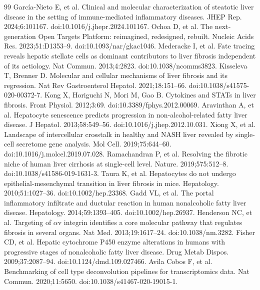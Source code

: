 \documentclass[11pt,a4paper]{article}
\begin{document}
{\begin{thebibliography}{99}
 Garc\'ia-Nieto E, et al. Clinical and molecular characterization of steatotic liver disease in the setting of immune-mediated inflammatory diseases. JHEP Rep. 2024;6:101167. doi:10.1016/j.jhepr.2024.101167.
 Ochoa D, et al. The next-generation Open Targets Platform: reimagined, redesigned, rebuilt. Nucleic Acids Res. 2023;51:D1353--9. doi:10.1093/nar/gkac1046.
 Mederacke I, et al. Fate tracing reveals hepatic stellate cells as dominant contributors to liver fibrosis independent of its aetiology. Nat Commun. 2013;4:2823. doi:10.1038/ncomms3823.
 Kisseleva T, Brenner D. Molecular and cellular mechanisms of liver fibrosis and its regression. Nat Rev Gastroenterol Hepatol. 2021;18:151--66. doi:10.1038/s41575-020-00372-7.
 Kong X, Horiguchi N, Mori M, Gao B. Cytokines and STATs in liver fibrosis. Front Physiol. 2012;3:69. doi:10.3389/fphys.2012.00069.
 Aravinthan A, et al. Hepatocyte senescence predicts progression in non-alcohol-related fatty liver disease. J Hepatol. 2013;58:549--56. doi:10.1016/j.jhep.2012.10.031.
 Xiong X, et al. Landscape of intercellular crosstalk in healthy and NASH liver revealed by single-cell secretome gene analysis. Mol Cell. 2019;75:644--60. doi:10.1016/j.molcel.2019.07.028.
 Ramachandran P, et al. Resolving the fibrotic niche of human liver cirrhosis at single-cell level. Nature. 2019;575:512--8. doi:10.1038/s41586-019-1631-3.
 Taura K, et al. Hepatocytes do not undergo epithelial-mesenchymal transition in liver fibrosis in mice. Hepatology. 2010;51:1027--36. doi:10.1002/hep.23368.
 Gadd VL, et al. The portal inflammatory infiltrate and ductular reaction in human nonalcoholic fatty liver disease. Hepatology. 2014;59:1393--405. doi:10.1002/hep.26937.
 Henderson NC, et al. Targeting of $\alpha$v integrin identifies a core molecular pathway that regulates fibrosis in several organs. Nat Med. 2013;19:1617--24. doi:10.1038/nm.3282.
 Fisher CD, et al. Hepatic cytochrome P450 enzyme alterations in humans with progressive stages of nonalcoholic fatty liver disease. Drug Metab Dispos. 2009;37:2087--94. doi:10.1124/dmd.109.027466.
 Avila Cobos F, et al. Benchmarking of cell type deconvolution pipelines for transcriptomics data. Nat Commun. 2020;11:5650. doi:10.1038/s41467-020-19015-1.
\end{thebibliography}
}
\end{document}
